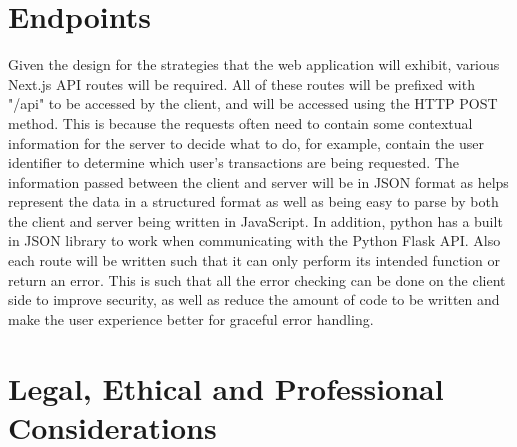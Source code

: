 \section{Endpoints}
\label{sec:endpoints}
Given the design for the strategies that the web application will exhibit, various Next.js API routes will be required. All of these routes will be prefixed with "/api" to be accessed by the client, and will be accessed using the HTTP POST method. This is because the requests often need to contain some contextual information for the server to decide what to do, for example, contain the user identifier to determine which user's transactions are being requested. The information passed between the client and server will be in JSON format as helps represent the data in a structured format as well as being easy to parse by both the client and server being written in JavaScript. In addition, python has a built in JSON library to work when communicating with the Python Flask API. Also each route will be written such that it can only perform its intended function or return an error. This is such that all the error checking can be done on the client side to improve security, as well as reduce the amount of code to be written and make the user experience better for graceful error handling.

\section{Legal, Ethical and Professional Considerations}




